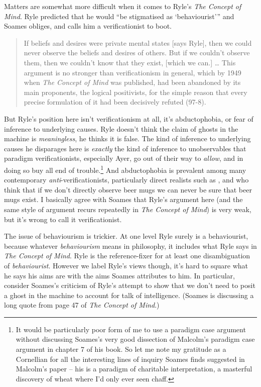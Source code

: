 Matters are somewhat more difficult when it comes to Ryle's \textit{The Concept of Mind}. Ryle predicted that he would ``be stigmatised as `behaviourist''' \citep[327]{Ryle1949} and Soames obliges, and calls him a verificationist to boot. 

\begin{quote}
If beliefs and desires were private mental states [says Ryle], then we could never observe the beliefs and desires of others. But if we couldn't observe them, then we couldn't know that they exist, [which we can.] {\dots} This argument is no stronger than verificationism in general, which by 1949 when \textit{The Concept of Mind} was published, had been abandoned by its main proponents, the logical positivists, for the simple reason that every precise formulation of it had been decisively refuted (97-8).
\end{quote}

\noindent But Ryle's position here isn't verificationism at all, it's abductophobia, or fear of inference to underlying causes. Ryle doesn't think the claim of ghosts in the machine is \textit{meaningless}, he thinks it is false. The kind of inference to underlying causes he disparages here is \textit{exactly} the kind of inference to unobservables that paradigm verificationists, especially Ayer, go out of their way to \textit{allow}, and in doing so buy all end of trouble.\footnote{It would be particularly poor form of me to use a paradigm case argument without discussing Soames's very good dissection of Malcolm's paradigm case argument in chapter 7 of his book. So let me note my gratitude as a Cornellian for all the interesting lines of inquiry Soames finds suggested in Malcolm's paper -- his is a paradigm of charitable interpretation, a masterful discovery of wheat where I'd only ever seen chaff.} And abductophobia is prevalent among many contemporary \textit{anti}\hyp{}verificationists, particularly direct realists such as \citet{McDowell1996}, \citet{Brewer1999} and \citet{Smith2003} who think that if we don't directly observe beer mugs we can never be sure that beer mugs exist. I basically agree with Soames that Ryle's argument here (and the same style of argument recurs repeatedly in \textit{The Concept of Mind}) is very weak, but it's wrong to call it verificationist.

The issue of behaviourism is trickier. At one level Ryle surely is a behaviourist, because whatever \textit{behaviourism} means in philosophy, it includes what Ryle says in \textit{The Concept of Mind}. Ryle is the reference-fixer for at least one disambiguation of \textit{behaviourist}. However we label Ryle's views though, it's hard to square what he says his aims are with the aims Soames attributes to him. In particular, consider Soames's criticism of Ryle's attempt to show that we don't need to posit a ghost in the machine to account for talk of intelligence. (Soames is discussing a long quote from page 47 of \textit{The Concept of Mind}.)

